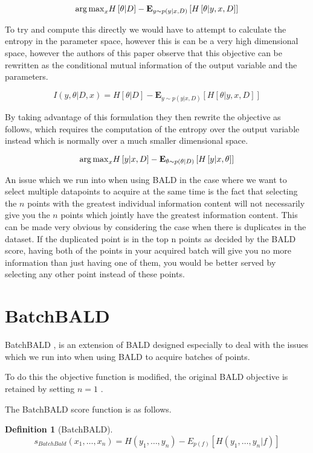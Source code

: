 \documentclass[12pt, a4paper]{report}
\theoremstyle{definition}
\theoremstyle{definition}
\newtheorem{definition}{Definition}[section]
\theoremstyle{definition}
\begin{document}
$${\operatorname*{arg\,max}}_x H \left[ \theta | D \right] - \mathbf{E}_{y \sim p(y | x, D)} \left[ H\left[ \theta | y, x, D\right]\right]$$

To try and compute this directly we would have to attempt to calculate the entropy in the parameter space, however this is can be a very high dimensional space, however the authors of this paper observe that this objective can be rewritten as the conditional mutual information of the output variable and the parameters.

$$I \left(y, \theta| D, x \right) = H \left[ \theta | D \right] - \mathbf{E}_{y \sim p(y | x, D)} \left[ H\left[ \theta | y, x, D\right]\right]$$



By taking advantage of this formulation they then rewrite the objective as follows, which requires the computation of the entropy over the output variable instead which is normally over a much smaller dimensional space.


$${\operatorname*{arg\,max}}_x H \left[ y | x, D \right] - \mathbf{E}_{\theta \sim p(\theta | D)} \left[ H\left[ y | x, \theta \right]\right]$$


An issue which we run into when using BALD in the case where we want to select multiple datapoints to acquire at the same time is the fact that selecting the $n$ points with the greatest individual information content will not necessarily give you the $n$ points which jointly have the greatest information content. This can be made very obvious by considering the case when there is duplicates in the dataset. If the duplicated point is in the top n points as decided by the BALD score, having both of the points in your acquired batch will give you no more information than just having one of them, you would be better served by selecting any other point instead of these points.

\section{BatchBALD}
BatchBALD \cite{kirsch2019batchbald}, is an extension of BALD designed especially to deal with the issues which we run into when using BALD to acquire batches of points.

To do this the objective function is modified, the original BALD objective is retained by setting $n = 1$ .

The BatchBALD score function is as follows.


\begin{definition}[BatchBALD]
    $$s_{BatchBald} (x_1, \ldots, x_n) = H(y_1, \ldots, y_n) - E_{p(f)}\left[H(y_1, \ldots, y_n | f)\right]$$
\end{definition}
\end{document}
